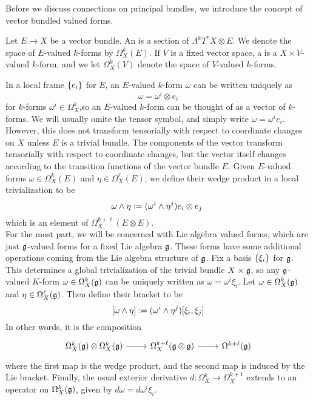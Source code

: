 Before we discuss connections on principal bundles, we introduce the concept of
vector bundled valued forms.
%
\begin{defn}
Let $E \to X$ be a vector bundle. An  is
a section of $\Lambda^kT^*X\otimes E$. We denote the space of $E$-valued $k$-forms
by $\Omega^k_X(E)$. If $V$ is a fixed vector space, a  is a $X\times V$-valued $k$-form, and we let $\Omega^k_X(V)$ denote the
space of $V$-valued $k$-forms.
\end{defn}
%
In a local frame $\left\lbrace e_i \right\rbrace$ for $E$, an $E$-valued $k$-form $\omega$ can be
written uniquely as
\[
\omega = \omega^i \otimes e_i
\]
for $k$-forms $\omega^i \in \Omega^k_X$,so an $E$-valued $k$-form can be thought of
as a vector of $k$-forms. We will usually omite the tensor symbol, and simply
write $\omega = \omega^ie_i$. However, this does not transform tensorially with
respect to coordinate changes on $X$ unless $E$ is a trivial bundle. The
components of the vector transform tensorially with respect to coordinate changes,
but the vector itself changes according to the transition functions of the vector
bundle $E$. Given $E$-valued forms $\omega \in \Omega^k_X(E)$ and
$\eta \in \Omega^\ell_X(E)$, we define their wedge product in a local trivialization to
be
\[
\omega \wedge \eta \vcentcolon=  (\omega^i \wedge \eta^j)e_i \otimes e_j\
\]
which is an element of $\Omega^{k+\ell}_X(E \otimes E)$. \\

For the most part, we will be concerned with Lie algebra valued forms,
which are just $\mathfrak{g}$-valued forms for a fixed Lie algebra $\mathfrak{g}$. These
forms have some additional operations coming from the Lie algebra structure
of $\mathfrak{g}$. Fix a basis $\left\lbrace \xi_i \right\rbrace$ for $\mathfrak{g}$. This determines a global
trivialization of the trivial bundle $X \times \mathfrak{g}$, so any $\mathfrak{g}$-valued
$K$-form $\omega \in \Omega^k_X(\mathfrak{g})$ can be uniquely written as
$\omega = \omega^i\xi_i$. Let
$\omega \in \Omega^k_X(\mathfrak{g})$ and $\eta \in \Omega^\ell_X(\mathfrak{g})$. Then define their
bracket to be
\[
[\omega\wedge\eta] \vcentcolon= (\omega^i \wedge \eta^j)[\xi_i,\xi_j]
\]
In other words, it is the composition
\[\begin{tikzcd}
\Omega^k_X(\g) \otimes \Omega^k_X(\g) \ar[r] & \Omega^{k+\ell}_X(\g \otimes \g) \ar[r] &
\Omega^{k+\ell}(\g)
\end{tikzcd}\]
where the first map is the wedge product, and the second map is induced by the
Lie bracket. Finally, the usual exterior derivative $d : \Omega^k_X \to \Omega^{k+1}_X$
extends to an operator on $\Omega^k_X(\mathfrak{g})$, given by $d\omega = d\omega^i\xi_i$. \\

